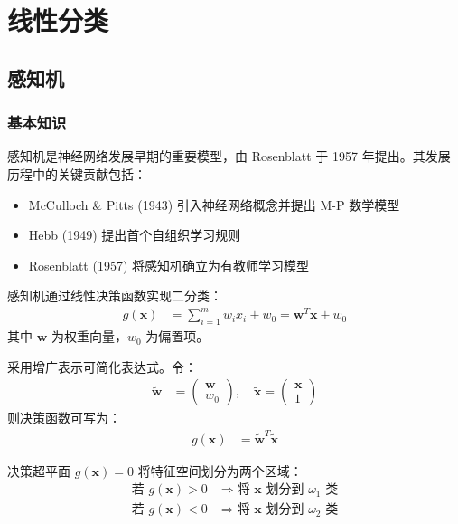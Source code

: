 
\section{线性分类}


\subsection{感知机}

\subsubsection{基本知识}

感知机是神经网络发展早期的重要模型，由 Rosenblatt 于 1957 年提出。其发展历程中的关键贡献包括：
\begin{itemize}
\item McCulloch \& Pitts (1943) 引入神经网络概念并提出 M-P 数学模型
\item Hebb (1949) 提出首个自组织学习规则
\item Rosenblatt (1957) 将感知机确立为有教师学习模型
\end{itemize}

\begin{definition}[线性分类决策函数]
感知机通过线性决策函数实现二分类：
\begin{align}
g(\boldsymbol{x}) &= \sum_{i=1}^{m} w_i x_i + w_0 = \boldsymbol{w}^T \boldsymbol{x} + w_0
\end{align}
其中 $\boldsymbol{w}$ 为权重向量，$w_0$ 为偏置项。
\end{definition}

采用增广表示可简化表达式。令：
\begin{align}
\tilde{\boldsymbol{w}} &= \begin{pmatrix} \boldsymbol{w} \\ w_0 \end{pmatrix}, \quad
\tilde{\boldsymbol{x}} = \begin{pmatrix} \boldsymbol{x} \\ 1 \end{pmatrix}
\end{align}
则决策函数可写为：
\begin{align}
g(\boldsymbol{x}) &= \tilde{\boldsymbol{w}}^T \tilde{\boldsymbol{x}}
\end{align}

\begin{definition}[分类规则]
决策超平面 $g(\boldsymbol{x}) = 0$ 将特征空间划分为两个区域：
\begin{align}
\text{若 } g(\boldsymbol{x}) > 0 &\Rightarrow \text{将 } \boldsymbol{x} \text{ 划分到 } \omega_1 \text{ 类} \\
\text{若 } g(\boldsymbol{x}) < 0 &\Rightarrow \text{将 } \boldsymbol{x} \text{ 划分到 } \omega_2 \text{ 类}
\end{align}
\end{definition}

